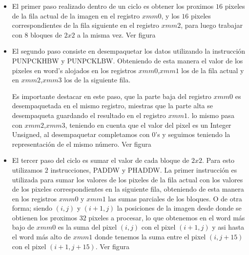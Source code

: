\begin{itemize}
	\item El primer paso realizado dentro de un ciclo es obtener los proximos $16$ pixeles de la fila actual de la imagen en el registro $xmm0$, y los $16$ pixeles correspondientes de la fila siguiente en el registro $xmm2$, para luego trabajar con $8$ bloques de $2x2$ a la misma vez. Ver figura %


	\item El segundo paso consiste en desempaquetar los datos utilizando la instrucción PUNPCKHBW y PUNPCKLBW. Obteniendo de esta manera el valor de los pixeles en word's alojados en los registros $xmm0$,$xmm1$ los de la fila actual y en $xmm2$,$xmm3$ los de la siguiente fila.

	Es importante destacar en este paso, que la parte baja del registro $xmm0$ es desempaquetada en el mismo registro, miestras que la parte alta se desempaqueta guardando el resultado en el registro $xmm1$. lo mismo pasa con $xmm2$,$xmm3$, teniendo en cuenta que el valor del pixel es un Integer Unsigned, al desempaquetar completamos con $0$'s y seguimos teniendo la representación de el mismo número. Ver figura %


	\item El tercer paso del ciclo es sumar el valor de cada bloque de $2x2$. Para esto utilizamos $2$ instrucciones, PADDW y PHADDW. La primer instrucción es utilizada para sumar los valores de los pixeles de la fila actual con los valores de los pixeles correspondientes en la siguiente fila, obteniendo de esta manera en los registros $xmm0$ y $xmm1$ las sumas parciales de los bloques. O de otra forma; siendo $(i,j)$ y $(i+1,j)$ la posiciones de la imagen desde donde se obtienen los proximos $32$ pixeles a procesar, lo que obtenemos en el word más bajo de $xmm0$ es la suma del pixel $(i,j)$ con el pixel $(i+1,j)$ y asi hasta el word más alto de $xmm1$ donde tenemos la suma entre el pixel $(i,j+15)$ con el pixel $(i+1,j+15)$. Ver figura %


\end{itemize}
